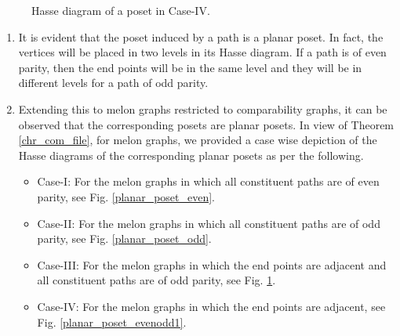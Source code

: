 \documentclass{llncs}
\newcommand{\vertex}{\node[vertex]}
\begin{document}
\begin{figure}[h!]
\begin{minipage}{.45\textwidth}
		\caption{Hasse diagram of a poset in Case-IV.}
		\label{planar_poset_evenodd}		 
	\end{minipage}
\end{figure} 


\begin{enumerate}
	\item 
	It is evident that the poset induced by a path is a planar poset. In fact, the vertices will be placed in two levels in its Hasse diagram. If a path is of even parity, then the end points will be in the same level and they will be in different levels for a path of odd parity.  
	
	
	
	\item Extending this to melon graphs restricted to comparability graphs, it can be observed that the corresponding posets are planar posets. In view of Theorem \ref{chr_com_file}, for melon graphs, we provided a case wise depiction of the Hasse diagrams of the corresponding planar posets as per the following. 
	\begin{itemize}
		\item 
		Case-I: For the melon graphs in which all constituent paths are of even parity, see Fig. \ref{planar_poset_even}.  
		
		\item Case-II: For the melon graphs in which all constituent paths are of odd parity, see Fig. \ref{planar_poset_odd}. 
		
		\item Case-III: For the melon graphs in which the end points are adjacent and all constituent paths are of odd parity, see Fig. \ref{planar_poset_evenodd}. 
		
		\item Case-IV: For the melon graphs in which the end points are adjacent, see Fig. \ref{planar_poset_evenodd1}.  
	\end{itemize}
	
\end{enumerate}
\end{document}
